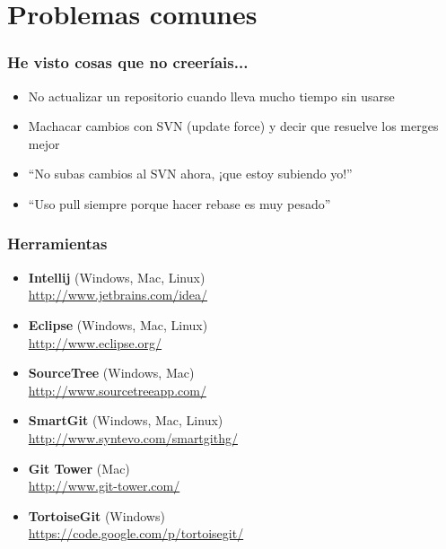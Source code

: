 \section{Problemas comunes}
\frame
{
\frametitle{He visto cosas que no creeríais...}
\begin{itemize}
\item No actualizar un repositorio cuando lleva mucho tiempo sin usarse
\item Machacar cambios con SVN (update force) y decir que resuelve los merges mejor
\item ``No subas cambios al SVN ahora, ¡que estoy subiendo yo!''
\item ``Uso pull siempre porque hacer rebase es muy pesado''
\end{itemize}
}

\usebackgroundtemplate{}
\frame
{
\frametitle{Herramientas}
\begin{itemize}
 \item \textbf{Intellij} (Windows, Mac, Linux)\\ \url{http://www.jetbrains.com/idea/}
 \item \textbf{Eclipse} (Windows, Mac, Linux)\\ \url{http://www.eclipse.org/}
 \item \textbf{SourceTree} (Windows, Mac)\\ \url{http://www.sourcetreeapp.com/}
 \item \textbf{SmartGit} (Windows, Mac, Linux)\\ \url{http://www.syntevo.com/smartgithg/}
 \item \textbf{Git Tower} (Mac)\\ \url{http://www.git-tower.com/}
 \item \textbf{TortoiseGit} (Windows)\\ \url{https://code.google.com/p/tortoisegit/}
\end{itemize}
}